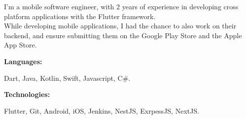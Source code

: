 \documentclass[9pt]{developercv} %
\begin{document}
\begin{minipage}[t]{0.46\textwidth}
	\vspace{-6pt}

	I'm a mobile software engineer, with 2 years of experience in developing cross platform applications with the Flutter framework.\\
	While developing mobile applications, I had the chance to also work on their backend, and ensure submitting them on the Google Play Store and the Apple App Store.
\end{minipage}
\hfill %
\begin{minipage}[t]{0.465\textwidth}
	\vspace{-6pt}

	\begin{minipage}[t]{0.2\textwidth}
		\textbf{Languages:}
	\end{minipage}
	\hfill
	\begin{minipage}[t]{0.73\textwidth}
		Dart, Java, Kotlin, Swift, Javascript, C\#.
	\end{minipage}
	\vspace{4mm}

	\begin{minipage}[t]{0.2\textwidth}
		\textbf{Technologies:}
	\end{minipage}
	\hfill
	\begin{minipage}[t]{0.73\textwidth}
		Flutter, Git, Android, iOS, Jenkins, NestJS, ExrpessJS, NextJS.
	\end{minipage}

\end{minipage}
\end{document}
